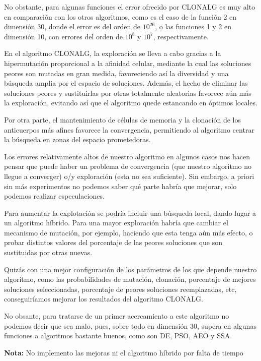 \documentclass[10pt,a4paper]{article}
\begin{document}
	No obstante, para algunas funciones el error ofrecido por CLONALG es muy alto en comparación con los otros algoritmos, como es el caso de la función 2 en dimensión 30, donde el error es del orden de $10^{26}$, o las funciones 1 y 2 en dimensión 10, con errores del orden de $10^8$ y $10^7$, respectivamente. 
	
	En el algoritmo CLONALG, la exploración se lleva a cabo gracias a la hipermutación proporcional a la afinidad celular, mediante la cual las soluciones peores son mutadas en gran medida, favoreciendo así la diversidad y una búsqueda amplia por el espacio de soluciones. Además, el hecho de eliminar las soluciones peores y sustituirlas por otras totalmente aleatorias favorece aún más la exploración, evitando así que el algoritmo quede estancando en óptimos locales. 
	
	Por otra parte, el mantenimiento de células de memoria y la clonación de los anticuerpos más afines favorece la convergencia, permitiendo al algoritmo centrar la búsqueda en zonas del espacio prometedoras. 
	
	Los errores relativamente altos de nuestro algoritmo en algunos casos nos hacen pensar que puede haber un problema de convergencia (que nuestro algoritmo no llegue a converger) o/y exploración (esta no sea suficiente). Sin embargo, a priori sin más experimentos no podemos saber qué parte habría que mejorar, solo podemos realizar especulaciones. 
	
	Para aumentar la explotación se podría incluir una búsqueda local, dando lugar a un algoritmo híbrido. Para una mayor exploración habría que cambiar el mecanismo de mutación, por ejemplo, haciendo que esta tenga aún más efecto, o probar distintos valores del porcentaje de las peores soluciones que son sustituidas por otras nuevas.
	
	Quizás con una mejor configuración de los parámetros de los que depende nuestro algoritmo, como las probabilidades de mutación, clonación, porcentaje de mejores soluciones seleccionadas, porcentaje de peores soluciones reemplazadas, etc, conseguiríamos mejorar los resultados del algoritmo CLONALG. 
	
	No obsante, para tratarse de un primer acercamiento a este algoritmo no podemos decir que sea malo, pues, sobre todo en dimensión 30, supera en algunas funciones a algoritmos bastante buenos, como son DE, PSO, AEO y SSA.
	
	\textbf{Nota:} No implemento las mejoras ni el algoritmo híbrido por falta de tiempo 
	
\end{document}
